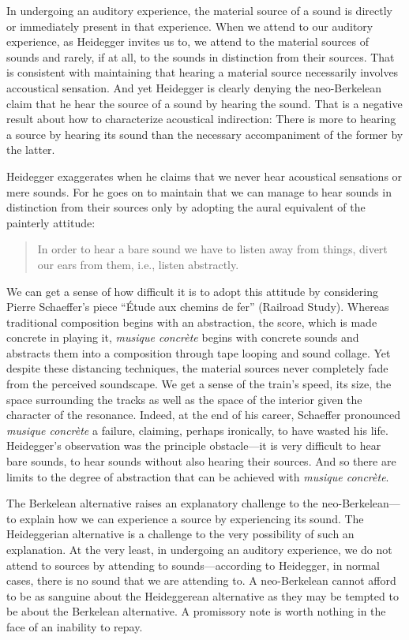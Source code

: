 \documentclass[12pt]{article}
\begin{document}
In undergoing an auditory experience, the material source of a sound is directly or immediately present in that experience. When we attend to our auditory experience, as Heidegger invites us to, we attend to the material sources of sounds and rarely, if at all, to the sounds in distinction from their sources. That is consistent with maintaining that hearing a material source necessarily involves accoustical sensation. And yet Heidegger is clearly denying the neo-Berkelean claim that he hear the source of a sound by hearing the sound. That is a negative result about how to characterize acoustical indirection: There is more to hearing a source by hearing its sound than the necessary accompaniment of the former by the latter.

Heidegger exaggerates when he claims that we never hear acoustical sensations or mere sounds. For he goes on to maintain that we can manage to hear sounds in distinction from their sources only by adopting the aural equivalent of the painterly attitude:
\begin{quote}
    In order to hear a bare sound we have to listen away from things, divert our ears from them, i.e., listen abstractly. \citep[152]{Heidegger:1935uq}
\end{quote}
We can get a sense of how difficult it is to adopt this attitude by considering Pierre Schaeffer's piece ``Étude aux chemins de fer'' (Railroad Study). Whereas traditional composition begins with an abstraction, the score, which is made concrete in playing it, \emph{musique concrète} begins with concrete sounds and abstracts them into a composition through tape looping and sound collage. Yet despite these distancing techniques, the material sources never completely fade from the perceived soundscape. We get a sense of the train's speed, its size, the space surrounding the tracks as well as the space of the interior given the character of the resonance. Indeed, at the end of his career, Schaeffer pronounced \emph{musique concrète} a failure, claiming, perhaps ironically, to have wasted his life. Heidegger's observation was the principle obstacle---it is very difficult to hear bare sounds, to hear sounds without also hearing their sources. And so there are limits to the degree of abstraction that can be achieved with \emph{musique concrète}.

The Berkelean alternative raises an explanatory challenge to the neo-Berkelean---\-to explain how we can experience a source by experiencing its sound. The Heideggerian alternative is a challenge to the very possibility of such an explanation. At the very least, in undergoing an auditory experience, we do not attend to sources by attending to sounds---according to Heidegger, in normal cases, there is no sound that we are attending to. A neo-Berkelean cannot afford to be as sanguine about the Heideggerean alternative as they may be tempted to be about the Berkelean alternative. A promissory note is worth nothing in the face of an inability to repay.
\end{document}
